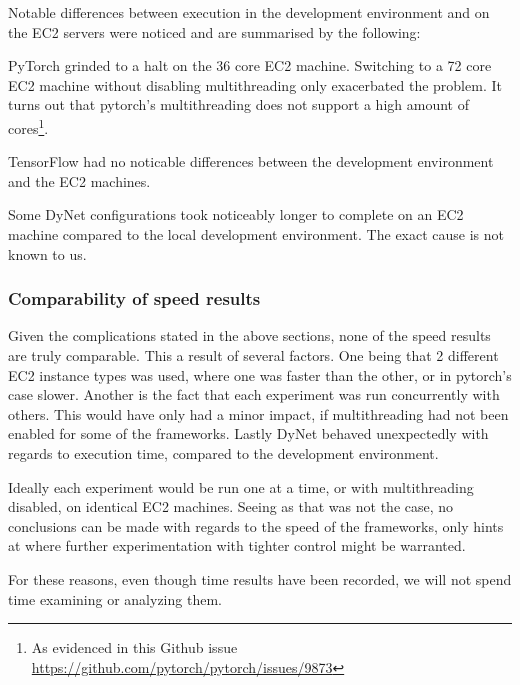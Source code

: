 Notable differences between execution in the development environment and on the
EC2 servers were noticed and are summarised by the following:

PyTorch grinded to a halt on the 36 core EC2 machine. Switching to a 72 core EC2
machine without disabling multithreading only exacerbated the problem. It turns
out that pytorch's multithreading does not support a high amount of
cores\footnote{As evidenced in this Github issue \url{https://github.com/pytorch/pytorch/issues/9873}}.

TensorFlow had no noticable differences between the development environment and
the EC2 machines.

Some DyNet configurations took noticeably longer to complete on an
EC2 machine compared to the local development environment. The exact cause is
not known to us.

\subsubsection{Comparability of speed results}

Given the complications stated in the above sections, none of the speed results
are truly comparable. This a result of several factors.
One being that 2 different EC2 instance types was used, where one was faster
than the other, or in pytorch's case slower.
Another is the fact that each experiment was run concurrently with others. This
would have only had a minor impact, if multithreading had not been enabled for
some of the frameworks.
Lastly DyNet behaved unexpectedly with regards to execution time, compared to the
development environment.

Ideally each experiment would be run one at a time, or with multithreading
disabled, on identical EC2 machines. Seeing as that was not the case, no
conclusions can be made with regards to the speed of the frameworks, only hints
at where further experimentation with tighter control might be warranted.

For these reasons, even though time results have been recorded, we will not
spend time examining or analyzing them.
